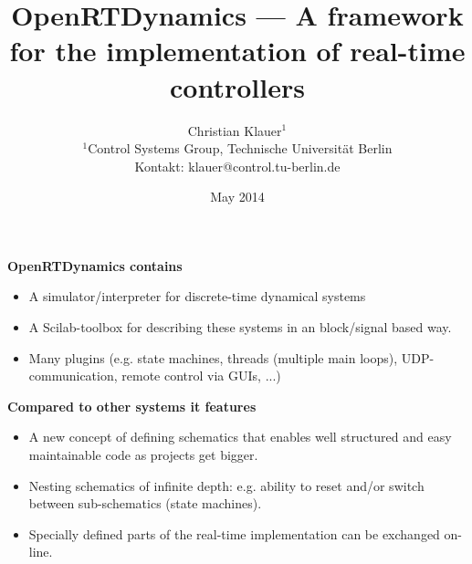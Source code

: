 \documentclass[serif,9pt,xcolor=dvipsnames]{beamer}
\title[]{OpenRTDynamics --- A framework for the implementation of real-time controllers}
\subtitle{} %
\date{May 2014}
\author{Christian Klauer$^{1}$\\
\tiny $^{1}$Control Systems Group, Technische Universität Berlin\\
Kontakt: klauer@control.tu-berlin.de
}
\begin{document}




\begin{frame}
  \maketitle
\end{frame}


\begin{frame}

\textbf{OpenRTDynamics contains}

 \begin{itemize}
  \item A simulator/interpreter for discrete-time dynamical systems
  \item A Scilab-toolbox for describing these systems in an block/signal based way.
  \item Many plugins (e.g. state machines, threads (multiple main loops), UDP-communication, remote control via GUIs, ...)
 \end{itemize}

\textbf{Compared to other systems it features}
\begin{itemize}
 \item A new concept of defining schematics that enables well structured and easy maintainable code as projects get bigger.
 \item Nesting schematics of infinite depth: e.g. ability to reset and/or switch between sub-schematics (state machines).
 \item Specially defined parts of the real-time implementation can be exchanged on-line.
\end{itemize}


\end{frame}
\end{document}
